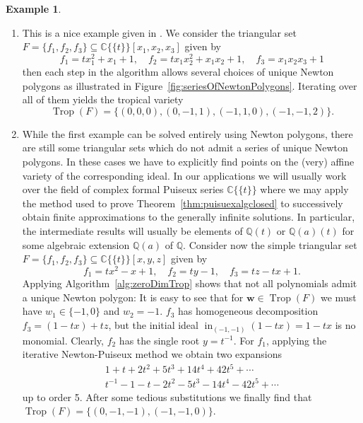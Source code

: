 \documentclass[
  paper=a4,
  titlepage,
  bibliography=totoc,
  listof=totoc,
  pagesize=pdftex
]{scrartcl}
\numberwithin{figure}{section}
\numberwithin{equation}{section}
\numberwithin{table}{section}
\newcommand*\setC{\mathds{C}}
\newcommand*\setQ{\mathds{Q}}
\newcommand*\puiseux[2]{#1\{\!\{#2\}\!\}}
\newcommand*\CCt{\puiseux{\setC}{t}}
\let\vec\mathbf
\DeclareMathOperator{\Trop}{Trop}
\DeclareMathOperator{\initial}{in}
\theoremstyle{definition}
\newtheorem{example}[definition]{Example}
\numberwithin{definition}{section}
\begin{document}
\begin{example} \label{ex:zeroDimTrop}\
  \begin{enumerate}
    \item This is a nice example given in \cite[Example~2.13]{tropPointsLinks}. We
      consider the triangular set $F = \{ f_1, f_2, f_3 \} \subseteq \CCt[x_1, x_2, x_3]$
      given by
      \[
        f_1 = tx_1^2 + x_1 + 1, \quad
        f_2 = tx_1x_2^2 + x_1x_2 + 1, \quad
        f_3 = x_1x_2x_3+1
      \]
      then each step in the algorithm allows several choices of unique Newton polygons as
      illustrated in Figure~\ref{fig:seriesOfNewtonPolygons}. Iterating over all of them
      yields the tropical variety
      \[
        \Trop(F) = \{ (0,0,0), (0,-1,1), (-1,1,0),(-1,-1,2) \}.
      \]
    \item While the first example can be solved entirely using Newton polygons, there are
      still some triangular sets which do not admit a series of unique Newton polygons. In
      these cases we have to explicitly find points on the (very) affine variety of the
      corresponding ideal. In our applications we will usually work over the field of
      complex formal Puiseux series $\CCt$ where we may apply the method used to prove
      Theorem~\ref{thm:puisuexalgclosed} to successively obtain finite approximations to
      the generally infinite solutions. In particular, the intermediate results will
      usually be elements of $\setQ(t)$ or $\setQ(a)(t)$ for some algebraic extension
      $\setQ(a)$ of $\setQ$. Consider now the simple triangular set $F = \{ f_1, f_2, f_3
      \} \subseteq \CCt[x,y,z]$ given by
      \[
        f_1 = tx^2 - x + 1, \quad
        f_2 = ty - 1, \quad
        f_3 = tz - tx + 1.
      \]
      Applying Algorithm~\ref{alg:zeroDimTrop} shows that not all polynomials admit a
      unique Newton polygon: It is easy to see that for $\vec w \in \Trop(F)$ we must have
      $w_1 \in \{ -1, 0 \}$ and $w_2 = -1$. $f_3$ has homogeneous decomposition $f_3 = (1
      - tx) + tz$, but the initial ideal $\initial_{(-1,-1)}(1-tx) = 1-tx$ is no monomial.
      Clearly, $f_2$ has the single root $y = t^{-1}$. For $f_1$, applying the iterative
      Newton-Puiseux method we obtain two expansions
      \begin{align*}
        1 + t + 2t^2 + 5t^3 + 14t^4 + 42 t^5 + \cdots \\
        t^{-1} - 1 - t - 2t^2 - 5t^3 - 14t^4 - 42t^5 + \cdots
      \end{align*}
      up to order 5. After some tedious substitutions we finally find that $\Trop(F) = \{
      (0,-1,-1), (-1,-1,0) \}$.
      \label{ex:zdt2}
  \end{enumerate}
\end{example}
\end{document}
